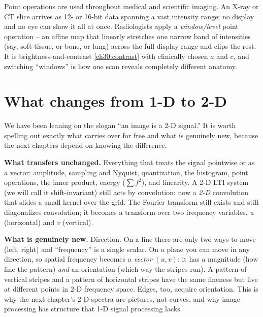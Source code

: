 \begin{applicationbox}
Point operations are used throughout medical and scientific imaging. An X-ray
or CT slice arrives as 12- or 16-bit data spanning a vast intensity range; no
display and no eye can show it all at once. Radiologists apply a \emph{window/level}
point operation -- an affine map that linearly stretches one narrow band of
intensities (say, soft tissue, or bone, or lung) across the full display range and
clips the rest. It is brightness-and-contrast \eqref{ch30:contrast} with clinically
chosen $a$ and $c$, and switching ``windows'' is how one scan reveals completely
different anatomy.
\end{applicationbox}

\section{What changes from 1-D to 2-D}
\label{ch30:jump}

We have been leaning on the slogan ``an image is a 2-D signal.'' It is worth
spelling out exactly what carries over for free and what is genuinely new, because
the next chapters depend on knowing the difference.

\textbf{What transfers unchanged.} Everything that treats the signal pointwise or
as a vector: amplitude, sampling and Nyquist, quantization, the histogram,
point operations, the inner product, energy ($\sum f^2$), and linearity. A 2-D
LTI system (we will call it shift-invariant) still acts by convolution: now a
\emph{2-D} convolution that slides a small kernel over the grid. The Fourier
transform still exists and still diagonalizes convolution; it becomes a
transform over two frequency variables, $u$ (horizontal) and $v$ (vertical).

\textbf{What is genuinely new.} Direction. On a line there are only two ways to
move (left, right) and ``frequency'' is a single scalar. On a plane you can move
in any direction, so spatial frequency becomes a \emph{vector} $(u,v)$: it has a
magnitude (how fine the pattern) \emph{and} an orientation (which way the stripes
run). A pattern of vertical stripes and a pattern of horizontal stripes have the
same fineness but live at different points in 2-D frequency space. Edges, too,
acquire orientation. This is why the next chapter's 2-D spectra are pictures, not
curves, and why image processing has structure that 1-D signal processing
lacks.

